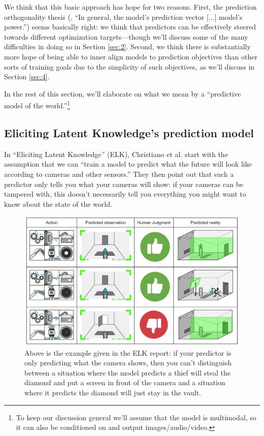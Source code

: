 \documentclass[
  onecolumn,
  natbib,
]{miri-tech-article}
\begin{document}
We think that this basic approach has hope for two reasons. First, the prediction orthogonality thesis (\cite{simulators}, ``In general, the model’s prediction vector [...] model’s power.'') seems basically right: we think that predictors can be effectively steered towards different optimization targets---though we'll discuss some of the many difficulties in doing so in Section \ref{sec:2}. Second, we think there is substantially more hope of being able to inner align\cite{risks} models to prediction objectives than other sorts of training goals\cite{how_become_confident} due to the simplicity of such objectives, as we'll discuss in Section \ref{sec:4}.

In the rest of this section, we'll elaborate on what we mean by a ``predictive model of the world.''\footnote{To keep our discussion general we'll assume that the model is multimodal, so it can also be conditioned on and output images/audio/video.}


\subsection{Eliciting Latent Knowledge's prediction model}\label{subsec:elk_prediction_model}

In ``Eliciting Latent Knowledge\cite{elk}'' (ELK), Christiano et al. start with the assumption that we can ``train a model to predict what the future will look like according to cameras and other sensors.'' They then point out that such a predictor only tells you what your cameras will show: if your cameras can be tampered with, this doesn't necessarily tell you everything you might want to know about the state of the world.

\begin{figure}[h!]
  \centering
  \includegraphics[width=\textwidth]{V6aklBz.png}
  \caption{Above is the example given in the ELK report: if your predictor is only predicting what the camera shows, then you can't distinguish between a situation where the model predicts a thief will steal the diamond and put a screen in front of the camera and a situation where it predicts the diamond will just stay in the vault.}
\end{figure}
\end{document}
